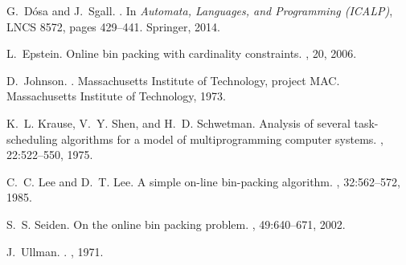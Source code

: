 \documentclass[11pt,a4paper]{article}
\begin{document}
{\begin{thebibliography}{10}
G.~D\'{o}sa and J.~Sgall.
.
\newblock In {\em Automata, Languages, and Programming (ICALP)}, LNCS 8572, pages 429--441.
  Springer, 2014.

L.~Epstein.
\newblock Online bin packing with cardinality constraints.
, 20, 2006.

D.~Johnson.
.
\newblock Massachusetts Institute of Technology, project MAC. Massachusetts
  Institute of Technology, 1973.

K.~L. Krause, V.~Y. Shen, and H.~D. Schwetman.
\newblock Analysis of several task-scheduling algorithms for a model of
  multiprogramming computer systems.
, 22:522--550, 1975.

C.~C. Lee and D.~T. Lee.
\newblock A simple on-line bin-packing algorithm.
, 32:562--572, 1985.

S.~S. Seiden.
\newblock On the online bin packing problem.
, 49:640--671, 2002.

J.~Ullman.
.
, 1971.

\end{thebibliography}



}
\end{document}
